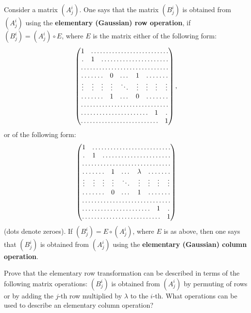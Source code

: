 \documentclass[12pt]{article}
\begin{document}
\begin{opredelenie}
  Consider a matrix $(A^i_j)$.  One says that the matrix $(B^i_j)$ is
  obtained from $(A^i_j)$ using the {\bf elementary (Gaussian) row
    operation}, if $(B^i_j) = (A^i_j)\circ E$, where $E$ is the matrix
  either of the following form:
\begin{equation}\label{gauss.1}
\begin{pmatrix}
1 &\hdotsfor{8}\\
\hdotsfor{1} &1 &\hdotsfor{7}\\
\hdotsfor{9}\\
\hdotsfor{3} &0 &\dots &1 &\hdotsfor{3}\\
\vdots &\vdots &\vdots 
&\vdots &\ddots &\vdots 
&\vdots &\vdots &\vdots \\
\hdotsfor{3} &1 &\dots &0 &\hdotsfor{3}\\
\hdotsfor{9}\\
\hdotsfor{7} &1 &\hdotsfor{1}\\
\hdotsfor{8} &1
\end{pmatrix},
\end{equation}
or of the following form:
\begin{equation}\label{gauss.2}
\begin{pmatrix}
1 &\hdotsfor{8}\\
\hdotsfor{1} &1 &\hdotsfor{7}\\
\hdotsfor{9}\\
\hdotsfor{3} &1 &\dots &\lambda &\hdotsfor{3}\\
\vdots &\vdots &\vdots 
&\vdots &\ddots &\vdots 
&\vdots &\vdots &\vdots \\
\hdotsfor{3} &0 &\dots &1 &\hdotsfor{3}\\
\hdotsfor{9}\\
\hdotsfor{7} &1 &\hdotsfor{1}\\
\hdotsfor{8} &1
\end{pmatrix}
\end{equation}
(dots denote zeroes). 
If $(B^i_j) = E \circ (A^i_j)$, where $E$ is as above, then one says
that $(B^i_j)$ is obtained from $(A^i_j)$ using the {\bf elementary
  (Gaussian) column operation}.
\end{opredelenie}

\begin{zadacha} Prove that the elementary row transformation can be
described in terms of the following matrix operations: $(B^i_j)$ is
obtained from $(A^i_j)$ by permuting of rows or by adding the
$j$-th row multiplied by $\lambda$ to the $i$-th. What operations
can be used to describe an elementary column operation?
\end{zadacha}
\end{document}
